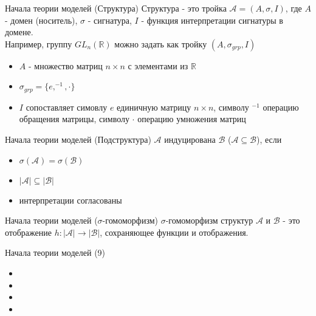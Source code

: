 \documentclass{beamer}
\begin{document}
\begin{frame}{Начала теории моделей (Структура)}
Структура - это тройка $\mathcal{A} = (A, \sigma, I)$, где $A$ - домен (носитель), $\sigma$ - сигнатура, $I$ - функция интерпретации сигнатуры в домене.\\
\bigskip
Например, группу $GL_n(\mathbb{R})$ можно задать как тройку $(A, \sigma_{grp}, I)$\\
  \begin{itemize}
    \item $A$ - множество матриц $n \times n$ с элементами из $\mathbb{R}$
    \item $\sigma_{grp} = \{e, ^{-1}, \cdot\}$
    \item $I$ сопоставляет симовлу $e$ единичную матрицу $n \times n$, символу $^{-1}$ операцию обращения матрицы, символу $\cdot$ операцию умножения матриц
  \end{itemize}
\end{frame}

\begin{frame}{Начала теории моделей (Подструктура)}
$\mathcal{A}$ индуцирована $\mathcal{B}$ ($\mathcal{A} \subseteq \mathcal{B}$), если\\
  \begin{itemize}
    \item $\sigma(\mathcal{A}) = \sigma(\mathcal{B})$
    \item $\left\vert \mathcal{A} \right\vert \subseteq \left\vert \mathcal{B} \right\vert$
    \item интерпретации согласованы
  \end{itemize}
\end{frame}

\begin{frame}{Начала теории моделей ($\sigma$-гомоморфизм)}
$\sigma$-гомоморфизм структур $\mathcal{A}$ и $\mathcal{B}$ - это отображение $h : \left\vert \mathcal{A} \right\vert \to \left\vert \mathcal{B} \right\vert$, сохраняющее функции и отображения.
\end{frame}

\begin{frame}{Начала теории моделей (9)}
  \begin{itemize}
    \item 
    \item 
    \item 
    \item 
  \end{itemize}
\end{frame}
\end{document}
